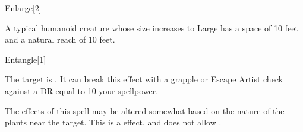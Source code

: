 \begin{spellsection}{Enlarge}[2]
    \begin{spellfooter}
        \spellnotes A typical humanoid creature whose size increases to Large has a space of 10 feet and a natural reach of 10 feet. \sizingspellnotes
        \miscastrandom
    \end{spellfooter}
    \begin{spellaugments}
    \end{spellaugments}
\end{spellsection}

\begin{spellsection}{Entangle}[1]
    \begin{spellheader}
    \end{spellheader}
    \begin{spellcontent}
        \begin{spelltargetinginfo}
        \end{spelltargetinginfo}
        \begin{spelleffects}
            \spelleffect The target is \entangled.
            It can break this effect with a grapple or Escape Artist check against a DR equal to 10 \add your spellpower.
            \spelldur \durbrief
        \end{spelleffects}
    \end{spellcontent}
    \begin{spellfooter}
        \spellnotes The effects of this spell may be altered somewhat based on the nature of the plants near the target.
        This is a  effect, and does not allow .
        \miscastrandom
    \end{spellfooter}
    \begin{spellaugments}
    \end{spellaugments}
\end{spellsection}

